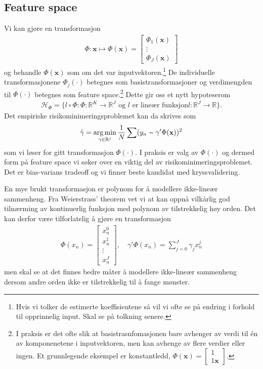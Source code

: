 \subsection{Feature space}
Vi kan gjøre en transformasjon 
\begin{align}
\Phi : \mathbf{x} \mapsto \Phi(\mathbf{x}) =
\begin{bmatrix}
\Phi_1(\mathbf{x}) \\
\vdots \\
\Phi_J(\mathbf{x})
\end{bmatrix}
\end{align}
og behandle $\Phi(\mathbf{x})$ som om det var inputvektoren.\footnote{Hvis vi tolker de estimerte koeffisientene så vil vi ofte se på endring i forhold til opprinnelig input. Skal se på tolkning senere.} De individuelle transformasjonene $\Phi_j(\cdot)$ betegnes som basistransformasjoner og verdimengden til $\Phi(\cdot)$ betegnes som feature space.\footnote{I praksis er det ofte slik at basistrasnfomasjonen bare avhenger av verdi til én av komponenetene i inputvektoren, men kan avhenge av flere verdier eller ingen. Et grunnlegende eksempel er konstantledd, $\Phi(\mathbf{x}) = \begin{bmatrix} 1 \\ 1\mathbf{x} \end{bmatrix}$.} Dette gir oss et nytt hypoteserom
\begin{align}
\mathcal{H}_{\Phi} = \{l \circ \Phi : \Phi:\mathbb{R}^K\to \mathbb{R}^J \text{ og } l \text{ er lineær funksjon} l:\mathbb{R}^J\to \mathbb{R}\}.
\end{align}
Det empiriske risikominimeringsproblemet kan da skrives som
\begin{align}
\hat{\gamma} = \operatorname*{arg\,min}_{\gamma \in \mathbb{R}^j} \frac{1}{N}\sum(y_n-\gamma'\Phi(\mathbf{x}))^2
\end{align}
som vi løser for gitt transformasjon $\Phi(\cdot)$. I praksis er valg av $\Phi(\cdot)$ og dermed form på feature space vi søker over en viktig del av risikominimeringsproblemet. Det er bias-varians tradeoff og vi finner beste kandidat med kryssvalidering.

En mye brukt transformasjon er polynom for å modellere ikke-lineær sammenheng. Fra Weierstrass' theorem vet vi at kan oppnå vilkårlig god tilnærming av kontinuerlig funksjon med polynom av tilstrekkelig høy orden. Det kan derfor være tilforlatelig å gjøre en transformasjon
\begin{align}
\Phi(x_n) = 
\begin{bmatrix}
x_n^0 \\
x_n^1 \\
\vdots \\
x_n^J
\end{bmatrix}
, \quad \gamma'\Phi(x_n) = \sum_{j=0}^J\gamma_jx_n^j
\end{align}
men skal se at det finnes bedre måter å modellere ikke-lineær sammenheng dersom andre orden ikke er tilstrekkelig til å fange mønster. 
